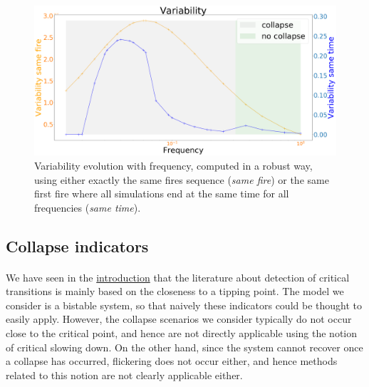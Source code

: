 \documentclass{article}
\begin{document}
\begin{figure}[h]
\begin{center}
\includegraphics[width=12cm]{same_fire.png}
\end{center}
\caption{\label{fig:samefire}Variability evolution with frequency, computed in a robust way, using either exactly the same fires sequence (\textit{same fire}) or the same first fire where all simulations end at the same time for all frequencies (\textit{same time}).}
\end{figure}


\subsection{Collapse indicators}


\paragraph{}
We have seen in the \hyperref[def_detection]{introduction} that the literature about detection of critical transitions is mainly based on the closeness to a tipping point. The model we consider is a bistable system, so that naively these indicators could be thought to easily apply. However, the collapse scenarios we consider typically do not occur close to the critical point, and hence are not directly applicable using the notion of critical slowing down. On the other hand, since the system cannot recover once a collapse has occurred, flickering does not occur either, and hence methods related to this notion are not clearly applicable either.
\end{document}
